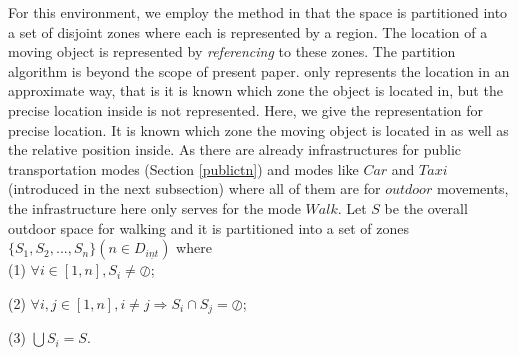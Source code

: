 For this environment, we employ the method in \cite{MR05,MRS05} that the space is 
partitioned into a set of disjoint zones where each is represented by a region. The 
location of a moving object is represented by \textit{referencing} to these zones. 
The partition algorithm is beyond the scope of present paper. 
\cite{MR05,MRS05} only represents the location in an approximate way, that is it is known
which zone the object is located in, but the precise location inside is not represented. Here,
we give the representation for precise location. It is known which zone the moving object is 
located in as well as the relative position inside. 
As there are already infrastructures for public transportation modes 
(Section \ref{publictn}) and modes like $Car$ and $Taxi$ (introduced in the next subsection)
where all of them are for $outdoor$ movements, the infrastructure here only serves for the mode 
$Walk$. Let $S$ be the overall outdoor space for walking and it is partitioned into a set of 
zones $\{S_1,S_2,...,S_n\}(n \in D_{\underline{int}})$ where \\

(1) $\forall i\in [1,n],S_i\neq\oslash$; 

(2) $\forall i,j \in[1,n], i \neq j \Rightarrow S_i\cap S_j=\oslash$; 

(3) $\bigcup S_i=S$.\\

